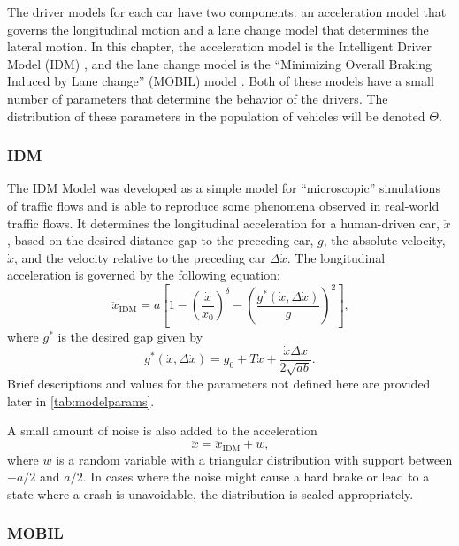 The driver models for each car have two components: an acceleration model that governs the longitudinal motion and a lane change model that determines the lateral motion.
In this chapter, the acceleration model is the Intelligent Driver Model (IDM) \cite{treiber2000idm}, and the lane change model is the ``Minimizing Overall Braking Induced by Lane change'' (MOBIL) model \cite{kesting2007mobil}.
Both of these models have a small number of parameters that determine the  behavior of the drivers.
The distribution of these parameters in the population of vehicles will be denoted $\Theta$.

\subsubsection{IDM}

The IDM Model was developed as a simple model for ``microscopic'' simulations of traffic flows and is able to reproduce some phenomena observed in real-world traffic flows.
It determines the longitudinal acceleration for a human-driven car, $\ddot{x}$, based on the desired distance gap to the preceding car, $g$, the absolute velocity, $\dot{x}$, and the velocity relative to the preceding car $\Delta \dot{x}$.
The longitudinal acceleration is governed by the following equation:
\begin{equation}
    \ddot{x}_\text{IDM} = a \left[ 1 - \left( \frac{\dot{x}}{\dot{x}_0} \right)^{\delta} - \left(\frac{g^*(\dot{x}, \Delta \dot{x})}{g}\right)^2 \right] \text{,}
\end{equation}
where $g^*$ is the desired gap given by
\begin{equation} \label{eqn:gstar}
    g^*(\dot{x}, \Delta \dot{x}) = g_0 + T \dot{x} + \frac{\dot{x}\Delta \dot{x}}{2 \sqrt{a b}} \text{.}
\end{equation}
Brief descriptions and values for the parameters not defined here are provided later in \cref{tab:modelparams}.

A small amount of noise is also added to the acceleration
\begin{equation}
    \ddot{x} = \ddot{x}_\text{IDM} + w \text{,}
\end{equation}
where $w$ is a random variable with a triangular distribution with support between $-a/2$ and $a/2$. In cases where the noise might cause a hard brake or lead to a state where a crash is unavoidable, the distribution is scaled appropriately.

\subsubsection{MOBIL}


